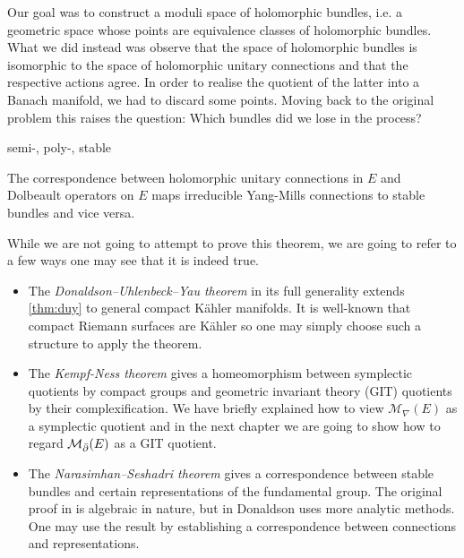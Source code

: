 \documentclass[12pt]{ociamthesis}  %
\begin{document}
Our goal was to construct a moduli space of holomorphic bundles,
i.e. a geometric space whose points are equivalence classes of
holomorphic bundles. What we did instead was observe that the space
of holomorphic bundles is isomorphic to the space of holomorphic unitary
connections and that the respective actions agree. In order to realise
the quotient of the latter into a Banach manifold, we had to discard
some points. Moving back to the original problem this raises
the question: Which bundles did we lose in the process?

\begin{definition}
  semi-, poly-, stable
\end{definition}

\begin{theorem}\label{thm:duy}
  The correspondence between holomorphic unitary connections in $E$ and
  Dolbeault operators on $E$ maps irreducible Yang-Mills connections to
  stable bundles and vice versa.
\end{theorem}

While we are not going to attempt to prove this theorem, we are
going to refer to a few ways one may see that it is indeed true.

\begin{itemize}
  \item The \emph{Donaldson–Uhlenbeck–Yau theorem} \missingcitation
        in its full generality extends \ref{thm:duy} to general compact
        K\"ahler manifolds. It is well-known that compact Riemann surfaces
        are K\"ahler \missingcitation so one may simply choose such a structure to
        apply the theorem.
  \item The \emph{Kempf-Ness theorem} \missingcitation gives a homeomorphism between
        symplectic quotients by compact groups and geometric invariant
        theory (GIT) quotients by their complexification. We have briefly
        explained how to view $\mathcal M_\nabla(E)$ as a symplectic quotient
        and in the next chapter we are going to show how to regard
        $\mathcal M_{\bar{\partial}}(E)$ as a GIT quotient.
  \item The \emph{Narasimhan–Seshadri theorem} \missingcitation gives
        a correspondence between stable bundles and certain representations
        of the fundamental group. The original proof in \cite{ns1965}
        is algebraic in nature, but in \cite{donaldson1983} Donaldson
        uses more analytic methods. One may use the result by establishing
        a correspondence between connections and representations.
\end{itemize}
\end{document}
